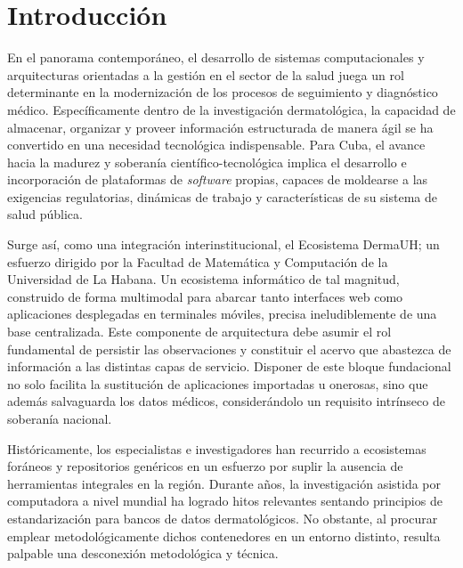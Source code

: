\chapter{Introducción}\label{ch:introduccion}


En el panorama contemporáneo, el desarrollo de sistemas computacionales y arquitecturas orientadas a la 
gestión en el sector de la salud juega un rol determinante en la modernización de los procesos de seguimiento 
y diagnóstico médico. Específicamente dentro de la investigación dermatológica, la capacidad de almacenar, 
organizar y proveer información estructurada de manera ágil se ha convertido en una necesidad tecnológica 
indispensable. Para Cuba, el avance hacia la madurez y soberanía científico-tecnológica implica el desarrollo 
e incorporación de plataformas de \textit{software} propias, capaces de moldearse a las exigencias regulatorias, 
dinámicas de trabajo y características de su sistema de salud pública.

Surge así, como una integración interinstitucional, el Ecosistema DermaUH; un esfuerzo dirigido por la 
Facultad de Matemática y Computación de la Universidad de La Habana. Un ecosistema informático de tal 
magnitud, construido de forma multimodal para abarcar tanto interfaces web como aplicaciones desplegadas 
en terminales móviles, precisa ineludiblemente de una base centralizada. Este componente de arquitectura 
debe asumir el rol fundamental de persistir las observaciones y constituir el acervo que abastezca de 
información a las distintas capas de servicio. Disponer de este bloque fundacional no solo facilita la 
sustitución de aplicaciones importadas u onerosas, sino que además salvaguarda los datos médicos, 
considerándolo un requisito intrínseco de soberanía nacional.

Históricamente, los especialistas e investigadores han recurrido a ecosistemas foráneos y repositorios 
genéricos en un esfuerzo por suplir la ausencia de herramientas integrales en la región. Durante años, 
la investigación asistida por computadora a nivel mundial ha logrado hitos relevantes sentando principios 
de estandarización para bancos de datos dermatológicos. No obstante, al procurar 
emplear metodológicamente dichos contenedores en un entorno distinto, resulta palpable una desconexión 
metodológica y técnica.

